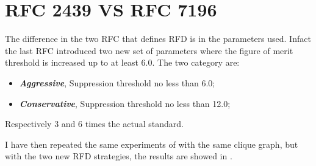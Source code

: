 \section{RFC 2439 VS RFC 7196}
\label{sec:bgp_rfd_comparison}

The difference in the two \ac{RFC} that defines \ac{RFD} \cite{rfc2439,rfc7196}
is in the parameters used.
Infact the last \ac{RFC} introduced two new set of parameters where the figure
of merit threshold is increased up to at least \num{6.0}.
The two category are:
\begin{itemize}
	\item \textit{\textbf{Aggressive}}, Suppression threshold no less than \num{6.0};
	\item \textit{\textbf{Conservative}}, Suppression threshold no less than \num{12.0};
\end{itemize}

Respectively \num{3} and \num{6} times the actual standard.

I have then repeated the same experiments of  with the same
clique graph, but with the two new \ac{RFD} strategies, the results are 
showed in .

